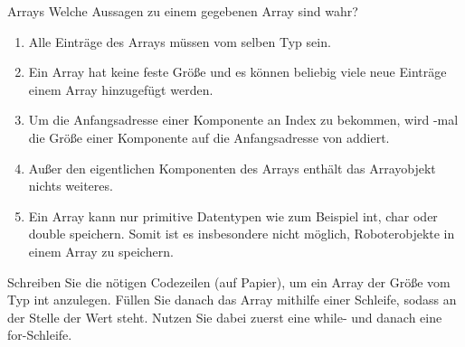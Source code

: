 \documentclass{../preamble}
\begin{document}
\begin{task}[credit = \stars{1}{3}]{Arrays}
    Welche Aussagen zu einem gegebenen Array  sind wahr?
    \begin{enumerate}[label = (\arabic*)]
        \item Alle Einträge des Arrays müssen vom selben Typ sein.
        \item Ein Array hat keine feste Größe und es können beliebig viele neue Einträge einem Array hinzugefügt werden.
        \item Um die Anfangsadresse einer Komponente an Index  zu bekommen, wird -mal die Größe einer Komponente auf die Anfangsadresse von  addiert.
        \item Außer den eigentlichen Komponenten des Arrays enthält das Arrayobjekt nichts weiteres.
        \item Ein Array kann nur primitive Datentypen wie zum Beispiel \textcolor{keywordcolor}{int}, \textcolor{keywordcolor}{char} oder \textcolor{keywordcolor}{double} speichern. Somit ist es insbesondere nicht möglich, Roboterobjekte in einem Array zu speichern.
    \end{enumerate}
    Schreiben Sie die nötigen Codezeilen (auf Papier), um ein Array  der Größe  vom Typ \textcolor{keywordcolor} int anzulegen. Füllen Sie danach das Array mithilfe einer Schleife, sodass an der Stelle  der  Wert  steht.  Nutzen Sie dabei zuerst eine \textcolor{keywordcolor}{while}- und danach eine \textcolor{keywordcolor}{for}-Schleife.

    \clearpage


\end{task}
\end{document}
